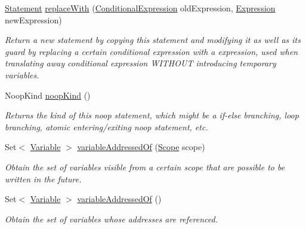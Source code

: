 \begin{DoxyCompactItemize}
\item 
\hyperlink{interfaceedu_1_1udel_1_1cis_1_1vsl_1_1civl_1_1model_1_1IF_1_1statement_1_1Statement}{Statement} \hyperlink{classedu_1_1udel_1_1cis_1_1vsl_1_1civl_1_1model_1_1common_1_1statement_1_1CommonNoopStatement_ab378f874c2465b8a9bc15a7c32e1a622}{replace\+With} (\hyperlink{interfaceedu_1_1udel_1_1cis_1_1vsl_1_1civl_1_1model_1_1IF_1_1expression_1_1ConditionalExpression}{Conditional\+Expression} old\+Expression, \hyperlink{interfaceedu_1_1udel_1_1cis_1_1vsl_1_1civl_1_1model_1_1IF_1_1expression_1_1Expression}{Expression} new\+Expression)
\begin{DoxyCompactList}\small\item\em Return a new statement by copying this statement and modifying it as well as its guard by replacing a certain conditional expression with a expression, used when translating away conditional expression W\+I\+T\+H\+O\+U\+T introducing temporary variables. \end{DoxyCompactList}\item 
Noop\+Kind \hyperlink{classedu_1_1udel_1_1cis_1_1vsl_1_1civl_1_1model_1_1common_1_1statement_1_1CommonNoopStatement_a25febb0b82115226e70c00fa85a4a22c}{noop\+Kind} ()
\begin{DoxyCompactList}\small\item\em Returns the kind of this noop statement, which might be a if-\/else branching, loop branching, atomic entering/exiting noop statement, etc. \end{DoxyCompactList}\item 
Set$<$ \hyperlink{interfaceedu_1_1udel_1_1cis_1_1vsl_1_1civl_1_1model_1_1IF_1_1variable_1_1Variable}{Variable} $>$ \hyperlink{classedu_1_1udel_1_1cis_1_1vsl_1_1civl_1_1model_1_1common_1_1statement_1_1CommonNoopStatement_ae8532988a9d1cb6eece78c87d28bddd3}{variable\+Addressed\+Of} (\hyperlink{interfaceedu_1_1udel_1_1cis_1_1vsl_1_1civl_1_1model_1_1IF_1_1Scope}{Scope} scope)
\begin{DoxyCompactList}\small\item\em Obtain the set of variables visible from a certain scope that are possible to be written in the future. \end{DoxyCompactList}\item 
Set$<$ \hyperlink{interfaceedu_1_1udel_1_1cis_1_1vsl_1_1civl_1_1model_1_1IF_1_1variable_1_1Variable}{Variable} $>$ \hyperlink{classedu_1_1udel_1_1cis_1_1vsl_1_1civl_1_1model_1_1common_1_1statement_1_1CommonNoopStatement_a2eb5ab7418193c86807025a3e93c1fad}{variable\+Addressed\+Of} ()
\begin{DoxyCompactList}\small\item\em Obtain the set of variables whose addresses are referenced. \end{DoxyCompactList}\item 

\end{DoxyCompactItemize}
